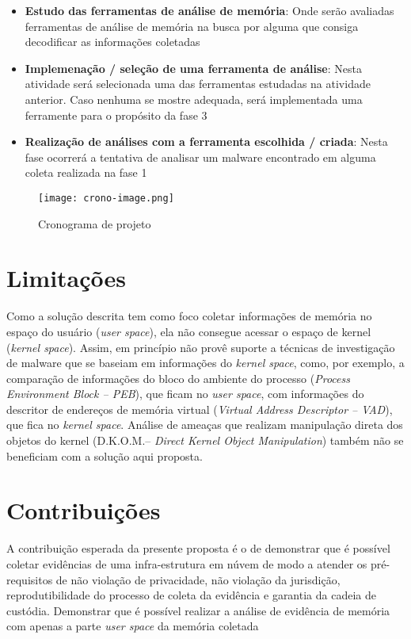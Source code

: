 \begin{itemize}
 \item \textbf{Estudo das ferramentas de análise de memória}: Onde serão avaliadas ferramentas de análise de memória na busca por alguma que consiga decodificar as informações coletadas 
 \item \textbf{Implemenação / seleção de uma ferramenta de análise}: Nesta atividade será selecionada uma das ferramentas estudadas na atividade anterior. Caso nenhuma se mostre adequada, será implementada uma ferramente para o propósito da fase 3
 \item \textbf{Realização de análises com a ferramenta escolhida / criada}: Nesta fase ocorrerá a tentativa de analisar um malware encontrado em alguma coleta realizada na fase 1
\end{itemize}

\begin{figure}[htb!]
\footnotesize
\caption{Cronograma de projeto}
\texttt{[image: crono-image.png]}
\centering
\label{fig:cronograma}
\end{figure}

\section{Limitações}

Como a solução descrita tem como foco coletar informações de memória no espaço do usuário (\textit{user space}), ela não consegue acessar o espaço de kernel (\textit{kernel space}). 
%
Assim, \fancyname em princípio não provê suporte a técnicas de investigação de malware que se baseiam em informações do \textit{kernel space}, como, por exemplo, a comparação de informações do bloco do ambiente do processo (\textit{Process Environment Block -- PEB}), que ficam no \textit{user space}, com informações do descritor de endereços de memória virtual (\textit{Virtual Address Descriptor -- VAD}), que fica no \textit{kernel space}. 
%
Análise de ameaças que realizam manipulação direta dos objetos do kernel (D.K.O.M.-- \textit{Direct Kernel Object Manipulation}) também não se beneficiam com a solução aqui proposta. 

\section{Contribuições}

A contribuição esperada da presente proposta é o de demonstrar que é possível coletar evidências de uma infra-estrutura em núvem de modo a atender os pré-requisitos de não violação de privacidade, não violação da jurisdição, reprodutibilidade do processo de coleta da evidência e garantia da cadeia de custódia.
%
Demonstrar que é possível realizar a análise de evidência de memória com apenas a parte \textit{user space} da memória coletada

